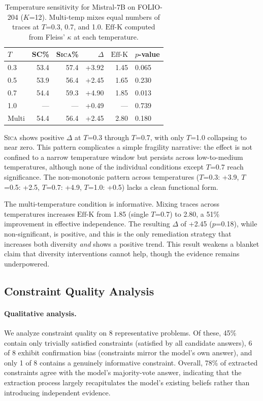 \documentclass[11pt,a4paper]{article}
\newcommand{\sica}{\textsc{Sica}}
\newcommand{\effk}{\text{Eff-K}}
\newcommand{\pp}{\text{pp}}
\begin{document}
\begin{table}[t]
\centering
\caption{Temperature sensitivity for Mistral-7B on FOLIO-204 ($K$=12). Multi-temp mixes equal numbers of traces at $T$=0.3, 0.7, and 1.0. $\effk{}$ computed from Fleiss' $\kappa$ at each temperature.}
\label{tab:tsens}
\small
\begin{tabular}{lrrrrl}
\toprule
$T$ & SC\% & \sica{}\% & $\Delta$\pp{} & $\effk{}$ & $p$-value \\
\midrule
0.3 & 53.4 & 57.4 & +3.92 & 1.45 & 0.065 \\
0.5 & 53.9 & 56.4 & +2.45 & 1.65 & 0.230 \\
0.7 & 54.4 & 59.3 & +4.90 & 1.85 & 0.013 \\
1.0 & --- & --- & +0.49 & --- & 0.739 \\
\midrule
Multi & 54.4 & 56.4 & +2.45 & 2.80 & 0.180 \\
\bottomrule
\end{tabular}
\end{table}

\sica{} shows positive $\Delta$ at $T$=0.3 through $T$=0.7, with only $T$=1.0 collapsing to near zero.
This pattern complicates a simple fragility narrative: the effect is not confined to a narrow temperature window but persists across low-to-medium temperatures, although none of the individual conditions except $T$=0.7 reach significance.
The non-monotonic pattern across temperatures ($T$=0.3: +3.9, $T$=0.5: +2.5, $T$=0.7: +4.9, $T$=1.0: +0.5) lacks a clean functional form.

The multi-temperature condition is informative.
Mixing traces across temperatures increases $\effk{}$ from 1.85 (single $T$=0.7) to 2.80, a 51\% improvement in effective independence.
The resulting $\Delta$ of +2.45\pp{} ($p$=0.18), while non-significant, is positive, and this is the only remediation strategy that increases both diversity \emph{and} shows a positive trend.
This result weakens a blanket claim that diversity interventions cannot help, though the evidence remains underpowered.

\subsection{Constraint Quality Analysis}

\paragraph{Qualitative analysis.}
We analyze constraint quality on 8 representative problems.
Of these, 45\% contain only trivially satisfied constraints (satisfied by all candidate answers), 6 of 8 exhibit confirmation bias (constraints mirror the model's own answer), and only 1 of 8 contains a genuinely informative constraint.
Overall, 78\% of extracted constraints agree with the model's majority-vote answer, indicating that the extraction process largely recapitulates the model's existing beliefs rather than introducing independent evidence.
\end{document}
